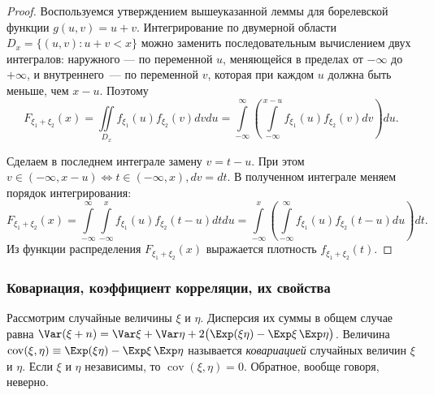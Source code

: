 \begin{proof}
    Воспользуемся утверждением вышеуказанной леммы для борелевской функции $g(u, v)=u+v$. 
    Интегрирование по двумерной области $D_{x}=\{(u, v) \colon u+v<x\}$ можно заменить последовательным вычислением двух интегралов: 
    наружного — по переменной $u$, меняющейся в пределах от $-\infty$ до $+\infty$, и внутреннего~--- по переменной $v$, которая при каждом $u$ должна быть меньше, чем $x-u$. 
    Поэтому
    \begin{equation*}
        F_{\xi_{1}+\xi_{2}}(x)=\iint\limits_{D_{x}} f_{\xi_{1}}(u) f_{\xi_{2}}(v) dv du=\int\limits_{-\infty}^{\infty}\left(\int\limits_{-\infty}^{x-u} f_{\xi_{1}}(u) f_{\xi_{2}}(v) dv\right) du.
    \end{equation*}
    
    Сделаем в последнем интеграле замену $v=t-u$. При этом $v \in(-\infty, x-u) \iff t \in(-\infty, x), d v=d t$. 
    В полученном интеграле меняем порядок интегрирования:
    \begin{equation*}
        F_{\xi_{1}+\xi_{2}}(x)=\int\limits_{-\infty}^{\infty} \int\limits_{-\infty}^{x} f_{\xi_{1}}(u) f_{\xi_{2}}(t-u) d t d u=\int\limits_{-\infty}^{x}\left(\int\limits_{-\infty}^{\infty} f_{\xi_{1}}(u) f_{\xi_{2}}(t-u) du\right) dt.
    \end{equation*}
    Из функции распределения $F_{\xi_{1}+\xi_{2}}(x)$ выражается плотность $f_{\xi_{1}+\xi_{2}}(t)$.
\end{proof}

\subsubsection{Ковариация, коэффициент корреляции, их свойства}

\begin{defn} Рассмотрим случайные величины $\xi$ и $\eta$. 
Дисперсия их суммы в общем случае равна $\Var(\xi+n)=\Var \xi+\Var \eta + 2 \bigl( \Exp (\xi \eta)-\Exp \xi \, \Exp \eta \bigr)$. Величина $\operatorname{cov}(\xi, \eta) \equiv \Exp (\xi \eta)-\Exp \xi \, \Exp \eta$ называется \textit{ковариацией} случайных величин $\xi$ и $\eta$. Если $\xi$ и $\eta$ независимы, то $\operatorname{cov}(\xi, \eta) = 0$. Обратное, вообще говоря, неверно.
\end{defn}

